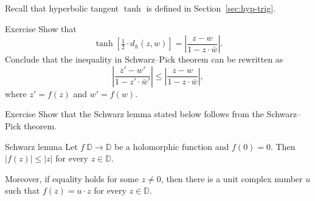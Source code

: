 Recall that hyperbolic tangent $\tanh$ is defined in Section~\ref{sec:hyp-trig}.

\begin{thm}{Exercise}\label{ex:schwarz-tanh}
Show that 
\[\tanh [\tfrac12\cdot d_h(z,w)]=\left|\frac{z-w}{1-z\cdot\bar w}\right|.\]
Conclude that the inequality in Schwarz--Pick theorem can be rewritten as
\[\left|\frac{z'-w'}{1-z'\cdot\bar w'}\right|\le\left|\frac{z-w}{1-z\cdot\bar w}\right|,\]
where
$z'=f(z)$ and $w'=f(w)$.
\end{thm}

\begin{thm}{Exercise}\label{ex:schwarz}
Show that the Schwarz lemma stated below 
follows from the Schwarz--Pick theorem.
\end{thm}

\begin{thm}{Schwarz lemma}
Let $f\: \mathbb{D}\to \mathbb{D}$ be a holomorphic function
and $f(0)=0$.
Then 
$|f(z)|\le |z|$
for every $z\in \mathbb{D}$.

Moreover, if equality holds for some $z\ne 0$, then there is a unit complex number $u$ 
such that 
$f(z)=u\cdot z$
for every $z\in\mathbb{D}$.
\end{thm}
